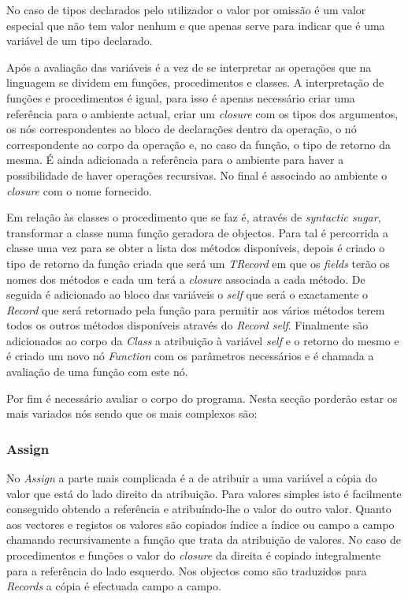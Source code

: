 No caso de tipos declarados pelo utilizador o valor por omissão é um valor especial que não tem valor nenhum e que apenas serve para indicar que é uma variável de um tipo declarado. 

Após a avaliação das variáveis é a vez de se interpretar as operações que na linguagem se dividem em funções, procedimentos e classes. A interpretação de funções e procedimentos é igual, para isso é apenas necessário criar uma referência para o ambiente actual, criar um \emph{closure} com os tipos dos argumentos, os nós correspondentes ao bloco de declarações dentro da operação, o nó correspondente ao corpo da operação e, no caso da função, o tipo de retorno da mesma. É ainda adicionada a referência para o ambiente para haver a possibilidade de haver operações recursivas. No final é associado ao ambiente o \emph{closure} com o nome fornecido.
  
Em relação às classes o procedimento que se faz é, através de \emph{syntactic sugar}, transformar a classe numa função geradora de objectos. Para tal é percorrida a classe uma vez para se obter a lista dos métodos disponíveis, depois é criado o tipo de retorno da função criada que será um \emph{TRecord} em que os \emph{fields} terão os nomes dos métodos e cada um terá a \emph{closure} associada a cada método. De seguida é adicionado ao bloco das variáveis o \emph{self} que será o exactamente o \emph{Record} que será retornado pela função para permitir aos vários métodos terem todos os outros métodos disponíveis através do \emph{Record self}. Finalmente são adicionados ao corpo da \emph{Class} a atribuição à variável \emph{self} e o retorno do mesmo e é criado um novo nó \emph{Function} com os parâmetros necessários e é chamada a avaliação de uma função com este nó.

Por fim é necessário avaliar o corpo do programa. Nesta secção porderão estar os mais variados nós sendo que os mais complexos são:

\subsubsection{Assign}

No \emph{Assign} a parte mais complicada é a de atribuir a uma variável a cópia do valor que está do lado direito da atribuição. Para valores simples isto é facilmente conseguido obtendo a referência e atribuíndo-lhe o valor do outro valor. Quanto aos vectores e registos os valores são copiados índice a índice ou campo a campo chamando recursivamente a função que trata da atribuição de valores. No caso de procedimentos e funções o valor do \emph{closure} da direita é copiado integralmente para a referência do lado esquerdo. Nos objectos como são traduzidos para \emph{Records} a cópia é efectuada campo a campo.

